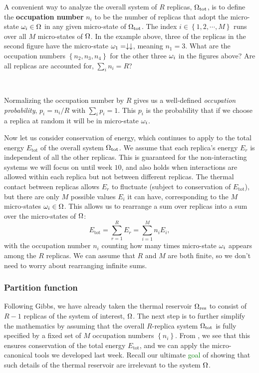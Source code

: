 A convenient way to analyze the overall system of $R$ replicas, $\Omega_{\text{tot}}$, is to define the \textbf{occupation number} $n_i$ to be the number of replicas that adopt the micro-state $\omega_i \in \Omega$ in any given micro-state of $\Omega_{\text{tot}}$.
The index $i \in \left\{1, 2, \cdots, M\right\}$ runs over all $M$ micro-states of $\Omega$.
In the example above, three of the replicas in the second figure have the micro-state $\omega_1 = \downarrow\downarrow$, meaning $n_1 = 3$.
What are the occupation numbers $\left\{n_2, n_3, n_4\right\}$ for the other three $\omega_i$ in the figures above?
Are all replicas are accounted for, $\sum_i n_i = R$?
\begin{mdframed}
  \ \\[50 pt]
\end{mdframed}
Normalizing the occupation number by $R$ gives us a well-defined \textit{occupation probability}, $p_i = n_i / R$ with $\sum_i p_i = 1$.
This $p_i$ is the probability that if we choose a replica at random it will be in micro-state $\omega_i$.

Now let us consider conservation of energy, which continues to apply to the total energy $E_{\text{tot}}$ of the overall system $\Omega_{\text{tot}}$.
We assume that each replica's energy $E_r$ is independent of all the other replicas.
This is guaranteed for the non-interacting systems we will focus on until week $10$, and also holds when interactions are allowed within each replica but not between different replicas.
The thermal contact between replicas allows $E_r$ to fluctuate (subject to conservation of $E_{\text{tot}}$), but there are only $M$ possible values $E_i$ it can have, corresponding to the $M$ micro-states $\omega_i \in \Omega$.
This allows us to rearrange a sum over replicas into a sum over the micro-states of $\Omega$:
\begin{equation}
  \label{eq:canon_Etot}
  E_{\text{tot}} = \sum_{r = 1}^R E_r = \sum_{i = 1}^M n_i E_i,
\end{equation}
with the occupation number $n_i$ counting how many times micro-state $\omega_i$ appears among the $R$ replicas.
We can assume that $R$ and $M$ are both finite, so we don't need to worry about rearranging infinite sums.



\subsubsection{Partition function}
Following Gibbs, we have already taken the thermal reservoir $\Omega_{\text{res}}$ to consist of $R - 1$ replicas of the system of interest, $\Omega$.
The next step is to further simplify the mathematics by assuming that the overall $R$-replica system $\Omega_{\text{tot}}$ is fully specified by a fixed set of $M$ occupation numbers $\left\{n_i\right\}$.
From , we see that this ensures conservation of the total energy $E_{\text{tot}}$, and we can apply the micro-canonical tools we developed last week.
Recall our ultimate \textcolor{green}{goal} of showing that such details of the thermal reservoir are irrelevant to the system $\Omega$.

